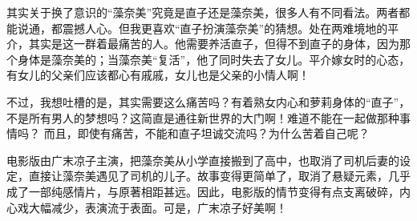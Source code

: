 其实关于换了意识的“藻奈美”究竟是直子还是藻奈美，很多人有不同看法。两者都能说通，都震撼人心。但我更喜欢“直子扮演藻奈美”的猜想。处在两难境地的平介，其实是这一群着最痛苦的人。他需要养活直子，但得不到直子的身体，因为那个身体是藻奈美的；当藻奈美“复活”，他了同时失去了女儿。平介嫁女时的心态，有女儿的父亲们应该都心有戚戚，女儿也是父亲的小情人啊！

不过，我想吐槽的是，其实需要这么痛苦吗？有着熟女内心和萝莉身体的“直子”，不是所有男人的梦想吗？这简直是通往新世界的大门啊！难道不能在一起做那种事情吗？ 
而且，即使有痛苦，不能和直子坦诚交流吗？为什么苦着自己呢？

电影版由广末凉子主演，把藻奈美从小学直接搬到了高中，也取消了司机后妻的设定，直接让藻奈美遇见了司机的儿子。故事变得更简单了，取消了悬疑元素，几乎成了一部纯感情片，与原著相距甚远。因此，电影版的情节变得有点支离破碎，内心戏大幅减少，表演流于表面。可是，广末凉子好美啊！